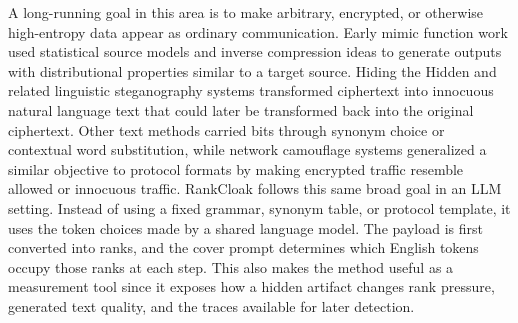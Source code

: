 \documentclass[fleqn,10pt]{wlscirep}
\begin{document}
A long-running goal in this area is to make arbitrary, encrypted, or otherwise high-entropy data appear as ordinary communication. Early mimic function work used statistical source models and inverse compression ideas to generate outputs with distributional properties similar to a target source\cite{Wayner1992MimicFunctions,Wayner1995StrongTheoreticalSteganography}. Hiding the Hidden and related linguistic steganography systems transformed ciphertext into innocuous natural language text that could later be transformed back into the original ciphertext\cite{ChapmanDavida1997HidingHidden,Bennett2004LinguisticSteganography}. Other text methods carried bits through synonym choice or contextual word substitution\cite{ChangClark2014PracticalLinguisticSteganography}, while network camouflage systems generalized a similar objective to protocol formats by making encrypted traffic resemble allowed or innocuous traffic\cite{Weinberg2012StegoTorus,Dyer2013FormatTransformingEncryption}. RankCloak follows this same broad goal in an LLM setting. Instead of using a fixed grammar, synonym table, or protocol template, it uses the token choices made by a shared language model. The payload is first converted into ranks, and the cover prompt determines which English tokens occupy those ranks at each step. This also makes the method useful as a measurement tool since it exposes how a hidden artifact changes rank pressure, generated text quality, and the traces available for later detection.
\end{document}
